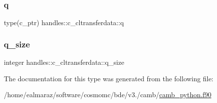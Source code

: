 \mbox{\label{structhandles_1_1c__cltransferdata_ad00d3ad0c5a466e00e417ca9545eeae5}} 
\subsubsection{\texorpdfstring{q}{q}}
{\footnotesize\ttfamily type(c\+\_\+ptr) handles\+::c\+\_\+cltransferdata\+::q}

\mbox{\label{structhandles_1_1c__cltransferdata_aa9eafa9668aca9d77fbbac65dd985de6}} 
\subsubsection{\texorpdfstring{q\+\_\+size}{q\_size}}
{\footnotesize\ttfamily integer handles\+::c\+\_\+cltransferdata\+::q\+\_\+size}



The documentation for this type was generated from the following file\+:\begin{DoxyCompactItemize}
\item 
/home/ealmaraz/software/cosmomc/bde/v3./camb/\mbox{\hyperlink{camb__python_8f90}{camb\+\_\+python.\+f90}}\end{DoxyCompactItemize}
